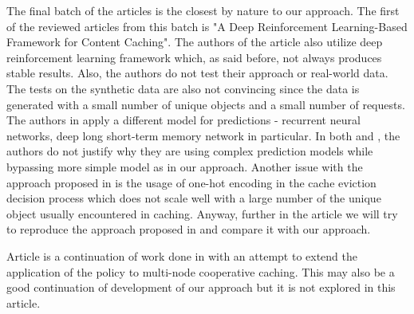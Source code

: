 The final batch of the articles is the closest by nature to our approach. The first of the reviewed articles from this batch is "A Deep Reinforcement Learning-Based Framework for Content Caching"\cite{22}. The authors of the article also utilize deep reinforcement learning framework which, as said before, not always produces stable results. Also, the authors do not test their approach or real-world data. The tests on the synthetic data are also not convincing since the data is generated with a small number of unique objects and a small number of requests. The authors in \cite{23} apply a different model for predictions - recurrent neural networks, deep long short-term memory network in particular. In both \cite{22} and \cite{23}, the authors do not justify why they are using complex prediction models while bypassing more simple model as in our approach. Another issue with the approach proposed in \cite{23} is the usage of one-hot encoding in the cache eviction decision process which does not scale well with a large number of the unique object usually encountered in caching. Anyway, further in the article we will try to reproduce the approach proposed in \cite{23} and compare it with our approach. 

Article \cite{24} is a continuation of work done in \cite{23} with an attempt to extend the application of the policy to multi-node cooperative caching. This may also be a good continuation of development of our approach but it is not explored in this article.

